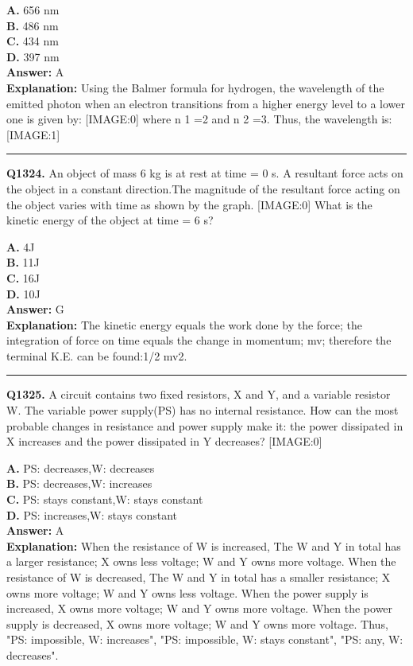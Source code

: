 \documentclass[12pt]{article}
\begin{document}
\textbf{A.} 656 nm \\
\textbf{B.} 486 nm \\
\textbf{C.} 434 nm \\
\textbf{D.} 397 nm \\

\textbf{Answer:} A \\
\textbf{Explanation:} Using the Balmer formula for hydrogen, the wavelength of the emitted photon when an electron transitions from a higher energy level to a lower one is given by:
[IMAGE:0]
where
n
1
​=2 and
n
2​
=3.
Thus, the wavelength is:
[IMAGE:1]

\hrule
\vspace{1em}


\noindent
\textbf{Q1324.} An object of mass 6 kg is at rest at time = 0 s. A resultant force acts on the object in a constant direction.The magnitude of the resultant force acting on the object varies with time as shown by the graph.
[IMAGE:0]
What is the kinetic energy of the object at time = 6 s?



\textbf{A.} 4J \\
\textbf{B.} 11J \\
\textbf{C.} 16J \\
\textbf{D.} 10J \\

\textbf{Answer:} G \\
\textbf{Explanation:} The kinetic energy equals the work done by the force; the integration of force on time equals the change in momentum; mv; therefore the terminal K.E. can be found:1/2 mv2.

\hrule
\vspace{1em}


\noindent
\textbf{Q1325.} A circuit contains two fixed resistors, X and Y, and a variable resistor W. The variable power supply(PS) has no internal resistance.
How can the most probable changes in resistance and power supply make it: the power dissipated in X increases and the power dissipated in Y decreases?
[IMAGE:0]



\textbf{A.} PS: decreases,W: decreases \\
\textbf{B.} PS: decreases,W: increases \\
\textbf{C.} PS: stays constant,W: stays constant \\
\textbf{D.} PS: increases,W: stays constant \\

\textbf{Answer:} A \\
\textbf{Explanation:} When the resistance of W is increased, The W and Y in total has a larger resistance; X owns less voltage; W and Y owns more voltage.
When the resistance of W is decreased, The W and Y in total has a smaller resistance; X owns more voltage; W and Y owns less voltage.
When the power supply is increased, X owns more voltage; W and Y owns more voltage.
When the power supply is decreased, X owns more voltage; W and Y owns more voltage.
Thus, "PS: impossible, W: increases", "PS: impossible, W: stays constant", "PS: any, W: decreases".
\end{document}
